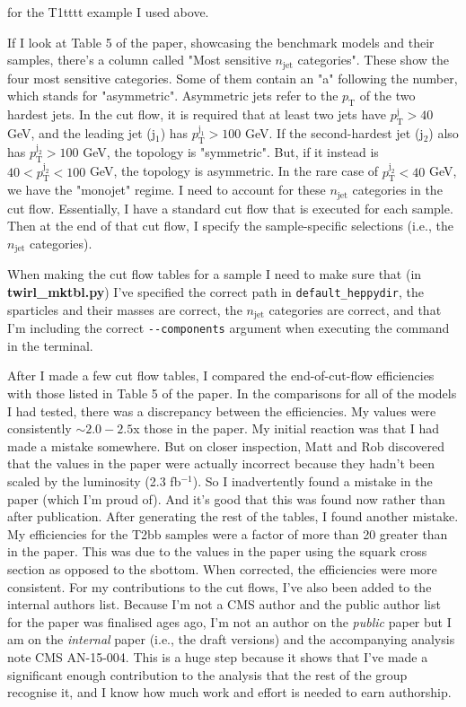 for the T1tttt example I used above.

If I look at Table 5 of the paper, showcasing the benchmark models and their samples, there's a column called "Most sensitive $n_{\mathrm{jet}}$ categories". These show the four most sensitive categories. Some of them contain an "a" following the number, which stands for "asymmetric". Asymmetric jets refer to the $p_{\mathrm{T}}$ of the two hardest jets. In the cut flow, it is required that at least two jets have $p_{\mathrm{T}}^{\mathrm{j}} > 40$ GeV, and the leading jet (j$_1$) has $p_{\mathrm{T}}^{\mathrm{j_1}} > 100$ GeV. If the second-hardest jet (j$_2$) also has $p_{\mathrm{T}}^{\mathrm{j_2}} > 100$ GeV, the topology is "symmetric". But, if it instead is $40 < p_{\mathrm{T}}^{\mathrm{j_2}} < 100$ GeV, the topology is asymmetric. In the rare case of $p_{\mathrm{T}}^{\mathrm{j_2}} < 40$ GeV, we have the "monojet" regime. I need to account for these $n_{\mathrm{jet}}$ categories in the cut flow. Essentially, I have a standard cut flow that is executed for each sample. Then at the end of that cut flow, I specify the sample-specific selections (i.e., the $n_{\mathrm{jet}}$ categories).

When making the cut flow tables for a sample I need to make sure that (in \textbf{twirl\_mktbl.py}) I've specified the correct path in \verb!default_heppydir!, the sparticles and their masses are correct, the $n_{\mathrm{jet}}$ categories are correct, and that I'm including the correct \verb!--components! argument when executing the command in the terminal.

After I made a few cut flow tables, I compared the end-of-cut-flow efficiencies with those listed in Table 5 of the paper. In the comparisons for all of the models I had tested, there was a discrepancy between the efficiencies. My values were consistently $\sim 2.0-2.5$x those in the paper. My initial reaction was that I had made a mistake somewhere. But on closer inspection, Matt and Rob discovered that the values in the paper were actually incorrect because they hadn't been scaled by the luminosity (2.3 fb$^{-1}$). So I inadvertently found a mistake in the paper (which I'm proud of). And it's good that this was found now rather than after publication. After generating the rest of the tables, I found another mistake. My efficiencies for the T2bb samples were a factor of more than 20 greater than in the paper. This was due to the values in the paper using the squark cross section as opposed to the sbottom. When corrected, the efficiencies were more consistent. For my contributions to the cut flows, I've also been added to the internal authors list. Because I'm not a CMS author and the public author list for the paper was finalised ages ago, I'm not an author on the \emph{public} paper but I am on the \emph{internal} paper (i.e., the draft versions) and the accompanying analysis note CMS AN-15-004. This is a huge step because it shows that I've made a significant enough contribution to the analysis that the rest of the group recognise it, and I know how much work and effort is needed to earn authorship.

